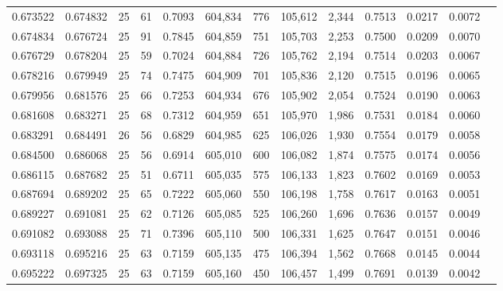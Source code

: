 \begin{tabular}{rrrrrrrrrrrrr}
0.673522 & 0.674832 &    25 &  61 &                                     0.7093 & 604,834 &     776 & 105,612 &   2,344 & 0.7513 & 0.0217 & 0.0072 \\
0.674834 & 0.676724 &    25 &  91 &                                     0.7845 & 604,859 &     751 & 105,703 &   2,253 & 0.7500 & 0.0209 & 0.0070 \\
0.676729 & 0.678204 &    25 &  59 &                                     0.7024 & 604,884 &     726 & 105,762 &   2,194 & 0.7514 & 0.0203 & 0.0067 \\
0.678216 & 0.679949 &    25 &  74 &                                     0.7475 & 604,909 &     701 & 105,836 &   2,120 & 0.7515 & 0.0196 & 0.0065 \\
0.679956 & 0.681576 &    25 &  66 &                                     0.7253 & 604,934 &     676 & 105,902 &   2,054 & 0.7524 & 0.0190 & 0.0063 \\
0.681608 & 0.683271 &    25 &  68 &                                     0.7312 & 604,959 &     651 & 105,970 &   1,986 & 0.7531 & 0.0184 & 0.0060 \\
0.683291 & 0.684491 &    26 &  56 &                                     0.6829 & 604,985 &     625 & 106,026 &   1,930 & 0.7554 & 0.0179 & 0.0058 \\
0.684500 & 0.686068 &    25 &  56 &                                     0.6914 & 605,010 &     600 & 106,082 &   1,874 & 0.7575 & 0.0174 & 0.0056 \\
0.686115 & 0.687682 &    25 &  51 &                                     0.6711 & 605,035 &     575 & 106,133 &   1,823 & 0.7602 & 0.0169 & 0.0053 \\
0.687694 & 0.689202 &    25 &  65 &                                     0.7222 & 605,060 &     550 & 106,198 &   1,758 & 0.7617 & 0.0163 & 0.0051 \\
0.689227 & 0.691081 &    25 &  62 &                                     0.7126 & 605,085 &     525 & 106,260 &   1,696 & 0.7636 & 0.0157 & 0.0049 \\
0.691082 & 0.693088 &    25 &  71 &                                     0.7396 & 605,110 &     500 & 106,331 &   1,625 & 0.7647 & 0.0151 & 0.0046 \\
0.693118 & 0.695216 &    25 &  63 &                                     0.7159 & 605,135 &     475 & 106,394 &   1,562 & 0.7668 & 0.0145 & 0.0044 \\
0.695222 & 0.697325 &    25 &  63 &                                     0.7159 & 605,160 &     450 & 106,457 &   1,499 & 0.7691 & 0.0139 & 0.0042 \\

\end{tabular}
